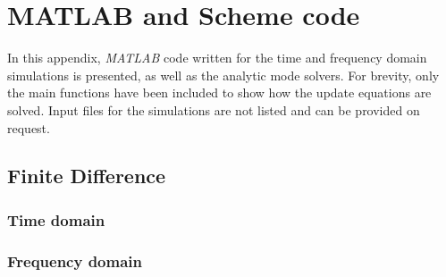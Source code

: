 \chapter{MATLAB and Scheme code}

In this appendix, \textit{MATLAB} code written for the time and frequency domain simulations is presented, as well as the analytic mode solvers. For brevity, only the main functions have been included to show how the update equations are solved. Input files for the simulations are not listed and can be provided on request.




%
\section{Finite Difference}
\label{app:FDTD}


\subsection{Time domain}
\label{app:FDTDeqtn}

\subsection{Frequency domain}
\label{app:FDFD}

%